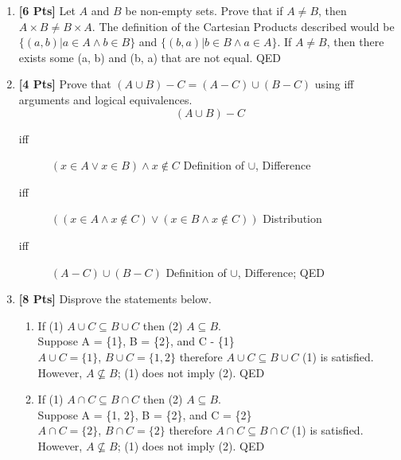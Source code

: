 \documentclass[12pt]{article}
\begin{document}
\begin{enumerate}
        \item {\bf [6 Pts]} Let $A$ and $B$ be non-empty sets. Prove that if $A \neq B$, then $A \times B \neq B \times A$.
            The definition of the Cartesian Products described would be $\{(a, b) | a \in A \land b \in B\}$ and $\{(b, a) | b \in B \land a \in A\}$. If $A \neq B$, then there exists some (a, b) and (b, a) that are not equal. QED
        \item {\bf [4 Pts]} Prove that $(A \cup B) - C = (A - C) \cup (B - C)$ using iff arguments and logical equivalences. \\
                $$(A \cup B) - C$$
            \begin{description}
                \item[iff] $(x \in A \lor x \in B) \land x \not\in C$ \null\hfill Definition of $\cup$, Difference
                \item[iff] $((x \in A \land x \not\in C) \lor (x \in B \land x \not\in C))$ \null\hfill Distribution
                \item[iff] $(A - C) \cup (B - C)$ \null\hfill Definition of $\cup$, Difference; QED
            \end{description}
        \item {\bf [8 Pts]} Disprove the statements below.
        \begin{enumerate}
            \item If (1) $A \cup C \subseteq B \cup C$ then (2) $A \subseteq B$. \\
                Suppose A = \{1\}, B = \{2\}, and C - \{1\} \\
                $A \cup C = \{1\}$, $B \cup C = \{1, 2\}$ therefore $A \cup C \subseteq B \cup C$ (1) is satisfied. \\
                However, $A \not\subseteq B$; (1) does not imply (2). QED
            \item If (1) $A \cap C \subseteq B \cap C$ then (2) $A \subseteq B$. \\
                Suppose A = \{1, 2\}, B = \{2\}, and C = \{2\} \\
                $A \cap C = \{2\}$, $B \cap C = \{2\}$ therefore $A \cap C \subseteq B \cap C$ (1) is satisfied. \\
                However, $A \not\subseteq B$; (1) does not imply (2). QED
        \end{enumerate}


\end{enumerate}
\end{document}
